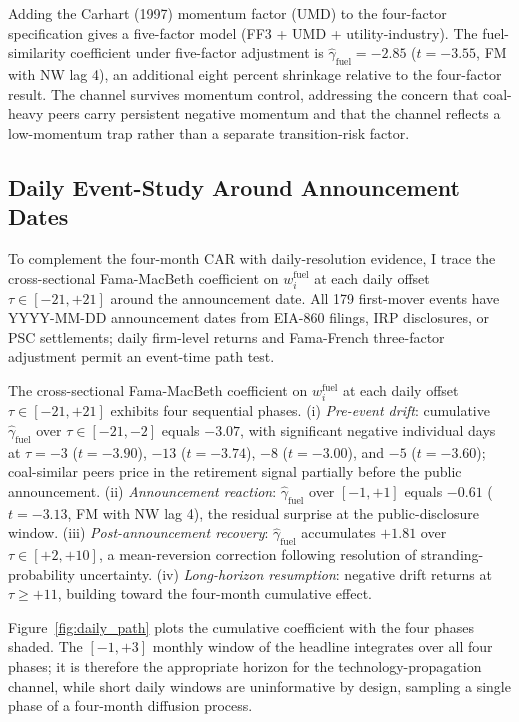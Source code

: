 \documentclass[12pt,a4paper]{article}
\begin{document}
Adding the Carhart (1997) momentum factor (UMD) to the four-factor specification gives a five-factor model (FF3 + UMD + utility-industry). The fuel-similarity coefficient under five-factor adjustment is $\hat\gamma_{\text{fuel}} = -2.85$ ($t = -3.55$, FM with NW lag 4), an additional eight percent shrinkage relative to the four-factor result. The channel survives momentum control, addressing the concern that coal-heavy peers carry persistent negative momentum and that the channel reflects a low-momentum trap rather than a separate transition-risk factor.

\subsection{Daily Event-Study Around Announcement Dates}\label{sec:daily_path}

To complement the four-month CAR with daily-resolution evidence, I trace the cross-sectional Fama-MacBeth coefficient on $w^{\text{fuel}}_i$ at each daily offset $\tau \in [-21, +21]$ around the announcement date. All 179 first-mover events have YYYY-MM-DD announcement dates from EIA-860 filings, IRP disclosures, or PSC settlements; daily firm-level returns and Fama-French three-factor adjustment permit an event-time path test.

The cross-sectional Fama-MacBeth coefficient on $w^{\text{fuel}}_i$ at each daily offset $\tau \in [-21, +21]$ exhibits four sequential phases. (i) \emph{Pre-event drift}: cumulative $\hat\gamma_{\text{fuel}}$ over $\tau \in [-21, -2]$ equals $-3.07$, with significant negative individual days at $\tau = -3$ ($t = -3.90$), $-13$ ($t = -3.74$), $-8$ ($t = -3.00$), and $-5$ ($t = -3.60$); coal-similar peers price in the retirement signal partially before the public announcement. (ii) \emph{Announcement reaction}: $\hat\gamma_{\text{fuel}}$ over $[-1, +1]$ equals $-0.61$ ($t = -3.13$, FM with NW lag 4), the residual surprise at the public-disclosure window. (iii) \emph{Post-announcement recovery}: $\hat\gamma_{\text{fuel}}$ accumulates $+1.81$ over $\tau \in [+2, +10]$, a mean-reversion correction following resolution of stranding-probability uncertainty. (iv) \emph{Long-horizon resumption}: negative drift returns at $\tau \geq +11$, building toward the four-month cumulative effect.

Figure~\ref{fig:daily_path} plots the cumulative coefficient with the four phases shaded. The $[-1, +3]$ monthly window of the headline integrates over all four phases; it is therefore the appropriate horizon for the technology-propagation channel, while short daily windows are uninformative by design, sampling a single phase of a four-month diffusion process.
\end{document}
